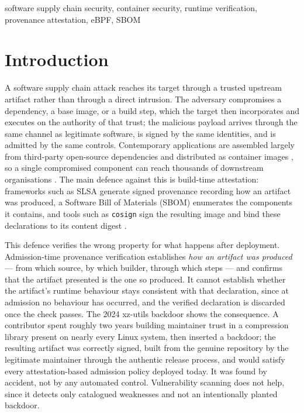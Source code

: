 \documentclass[conference]{IEEEtran}
\begin{document}
\begin{IEEEkeywords}
software supply chain security, container security, runtime
verification, provenance attestation, eBPF, SBOM
\end{IEEEkeywords}

\section{Introduction}

A software supply chain attack reaches its target through a trusted
upstream artifact rather than through a direct intrusion. The adversary
compromises a dependency, a base image, or a build step, which the
target then incorporates and executes on the authority of that trust;
the malicious payload arrives through the same channel as legitimate
software, is signed by the same identities, and is admitted by the same
controls. Contemporary applications are assembled largely from
third-party open-source dependencies and distributed as container images
\cite{mounesan2023}, so a single compromised component can reach
thousands of downstream organisations \cite{ladisa2023,okafor2022}. The
main defence against this is build-time attestation: frameworks such as
SLSA generate signed provenance recording how an artifact was produced,
a Software Bill of Materials (SBOM) enumerates the components it
contains, and tools such as \texttt{cosign} sign the resulting image and
bind these declarations to its content digest
\cite{intoto2019,slsa2023,sigstore2022}.

This defence verifies the wrong property for what happens after
deployment. Admission-time provenance verification establishes
\emph{how an artifact was produced} --- from which source, by which
builder, through which steps --- and confirms that the artifact
presented is the one so produced. It cannot establish whether the
artifact's runtime behaviour stays consistent with that declaration,
since at admission no behaviour has occurred, and the verified
declaration is discarded once the check passes. The 2024 xz-utils
backdoor shows the consequence. A contributor spent roughly two years
building maintainer trust in a compression library present on nearly
every Linux system, then inserted a backdoor; the resulting artifact was
correctly signed, built from the genuine repository by the legitimate
maintainer through the authentic release process, and would satisfy
every attestation-based admission policy deployed today. It was found by
accident, not by any automated control. Vulnerability scanning does not
help, since it detects only catalogued weaknesses and not an
intentionally planted backdoor.
\end{document}
